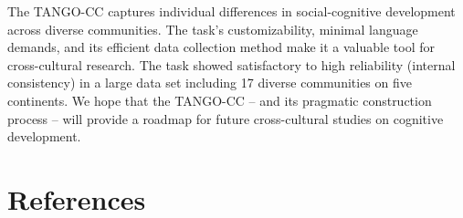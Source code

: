 \documentclass[
  man,floatsintext]{apa7}
\begin{document}
The TANGO-CC captures individual differences in social-cognitive development across diverse communities.
The task's customizability, minimal language demands, and its efficient data collection method make it a valuable tool for cross-cultural research.
The task showed satisfactory to high reliability (internal consistency) in a large data set including 17 diverse communities on five continents.
We hope that the TANGO-CC -- and its pragmatic construction process -- will provide a roadmap for future cross-cultural studies on cognitive development.

\newpage

\section{References}\label{references}

\begingroup
\setlength{\parindent}{-0.5in}
\setlength{\leftskip}{0.5in}
\end{document}
